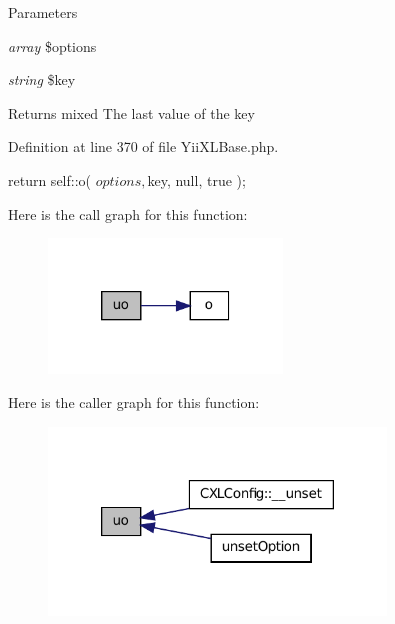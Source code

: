 \begin{DoxyParams}{Parameters}
\item[{\em array}]\$options \item[{\em string}]\$key \end{DoxyParams}
\begin{DoxyReturn}{Returns}
mixed The last value of the key 
\end{DoxyReturn}


Definition at line 370 of file YiiXLBase.php.




\begin{DoxyCode}
  {
    return self::o( $options, $key, null, true );
  }
\end{DoxyCode}




Here is the call graph for this function:\nopagebreak
\begin{figure}[H]
\begin{center}
\leavevmode
\includegraphics[width=176pt]{classYiiXLBase_a62ea6eb4323d1c2f553d2bf12288e6e1_cgraph}
\end{center}
\end{figure}




Here is the caller graph for this function:\nopagebreak
\begin{figure}[H]
\begin{center}
\leavevmode
\includegraphics[width=254pt]{classYiiXLBase_a62ea6eb4323d1c2f553d2bf12288e6e1_icgraph}
\end{center}
\end{figure}




